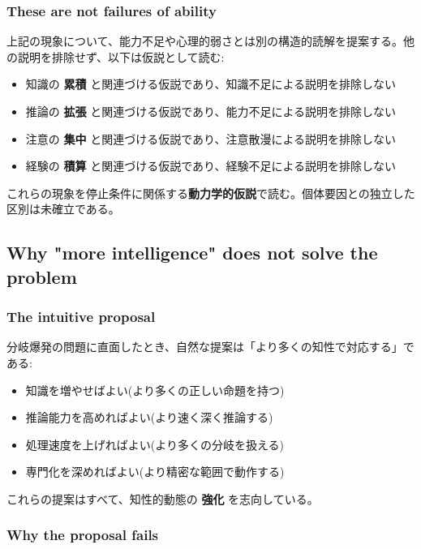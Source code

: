 \subsubsection{These are not failures of ability}


上記の現象について、能力不足や心理的弱さとは別の構造的読解を提案する。他の説明を排除せず、以下は仮説として読む:

\begin{itemize}
\item 知識の \textbf{累積} と関連づける仮説であり、知識不足による説明を排除しない
\item 推論の \textbf{拡張} と関連づける仮説であり、能力不足による説明を排除しない
\item 注意の \textbf{集中} と関連づける仮説であり、注意散漫による説明を排除しない
\item 経験の \textbf{積算} と関連づける仮説であり、経験不足による説明を排除しない
\end{itemize}

これらの現象を停止条件に関係する\textbf{動力学的仮説}で読む。個体要因との独立した区別は未確立である。

\subsection{Why "more intelligence" does not solve the problem}


\subsubsection{The intuitive proposal}


分岐爆発の問題に直面したとき、自然な提案は「より多くの知性で対応する」である:

\begin{itemize}
\item 知識を増やせばよい(より多くの正しい命題を持つ)
\item 推論能力を高めればよい(より速く深く推論する)
\item 処理速度を上げればよい(より多くの分岐を扱える)
\item 専門化を深めればよい(より精密な範囲で動作する)
\end{itemize}

これらの提案はすべて、知性的動態の \textbf{強化} を志向している。

\subsubsection{Why the proposal fails}


